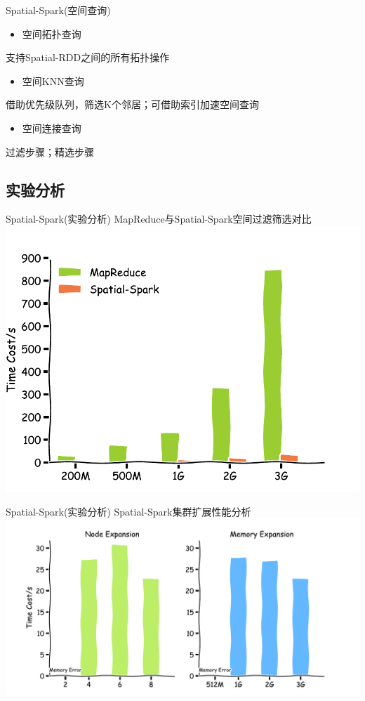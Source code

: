 \begin{frame}[c]{Spatial-Spark(空间查询)}
    \begin{itemize}
        \item \alert{空间拓扑查询}
    \end{itemize}
    支持Spatial-RDD之间的所有拓扑操作

    \pause
    \begin{itemize}
        \item \alert{空间KNN查询}
    \end{itemize}
    借助优先级队列，筛选K个邻居；可借助索引加速空间查询

    \pause
    \begin{itemize}
        \item \alert{空间连接查询}
    \end{itemize}
    过滤步骤；精选步骤
\end{frame}
\subsection{实验分析}

\begin{frame}[t]{Spatial-Spark(实验分析)}
    MapReduce与Spatial-Spark空间过滤筛选对比
    \vspace{1em}
    \includegraphics[width=0.9 \textwidth]{figures/topo_query.pdf}
\end{frame}

\begin{frame}[t]{Spatial-Spark(实验分析)}
    Spatial-Spark集群扩展性能分析
    \vspace{1em}
    \includegraphics[width=0.9 \textwidth]{figures/node_memory.pdf}
\end{frame}

